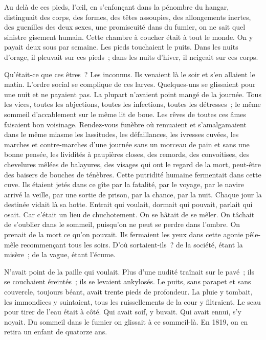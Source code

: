 \documentclass[french,twoside]{book} %
\begin{document}
Au delà de ces pieds, l’œil, en s’enfonçant dans la pénombre du hangar, distinguait des corps, des formes, des têtes assoupies, des allongements inertes, des guenilles des deux sexes, une promiscuité dans du fumier, on ne sait quel sinistre gisement humain. Cette chambre à coucher était à tout le monde. On y payait deux sous par semaine. Les pieds touchaient le puits. Dans les nuits d’orage, il pleuvait sur ces pieds ; dans les nuits d’hiver, il neigeait sur ces corps.\par
Qu’était-ce que ces êtres ? Les inconnus. Ils venaient là le soir et s’en allaient le matin. L’ordre social se complique de ces larves. Quelques-uns se glissaient pour une nuit et ne payaient pas. La plupart n’avaient point mangé de la journée. Tous les vices, toutes les abjections, toutes les infections, toutes les détresses ;  le même sommeil d’accablement sur le même lit de boue. Les rêves de toutes ces âmes faisaient bon voisinage. Rendez-vous funèbre où remuaient et s’amalgamaient dans le même miasme les lassitudes, les défaillances, les ivresses cuvées, les marches et contre-marches d’une journée sans un morceau de pain et sans une bonne pensée, les lividités à paupières closes, des remords, des convoitises, des chevelures mêlées de balayures, des visages qui ont le regard de la mort, peut-être des baisers de bouches de ténèbres. Cette putridité humaine fermentait dans cette cuve. Ils étaient jetés dans ce gîte par la fatalité, par le voyage, par le navire arrivé la veille, par une sortie de prison, par la chance, par la nuit. Chaque jour la destinée vidait là sa hotte. Entrait qui voulait, dormait qui pouvait, parlait qui osait. Car c’était un lieu de chuchotement. On se hâtait de se mêler. On tâchait de s’oublier dans le sommeil, puisqu’on ne peut se perdre dans l’ombre. On prenait de la mort ce qu’on pouvait. Ils fermaient les yeux dans cette agonie pêle-mêle recommençant tous les soirs. D’où sortaient-ils ? de la société, étant la misère ; de la vague, étant l’écume.\par
N’avait point de la paille qui voulait. Plus d’une nudité traînait sur le pavé ; ils se couchaient éreintés ; ils se levaient ankylosés. Le puits, sans parapet et sans couvercle, toujours béant, avait trente pieds de profondeur. La pluie y tombait, les immondices y suintaient, tous les ruissellements de la cour y filtraient. Le seau pour tirer de l’eau était à côté. Qui avait soif, y buvait. Qui avait ennui, s’y noyait. Du sommeil dans  le fumier on glissait à ce sommeil-là. En 1819, on en retira un enfant de quatorze ans.\par
\end{document}
